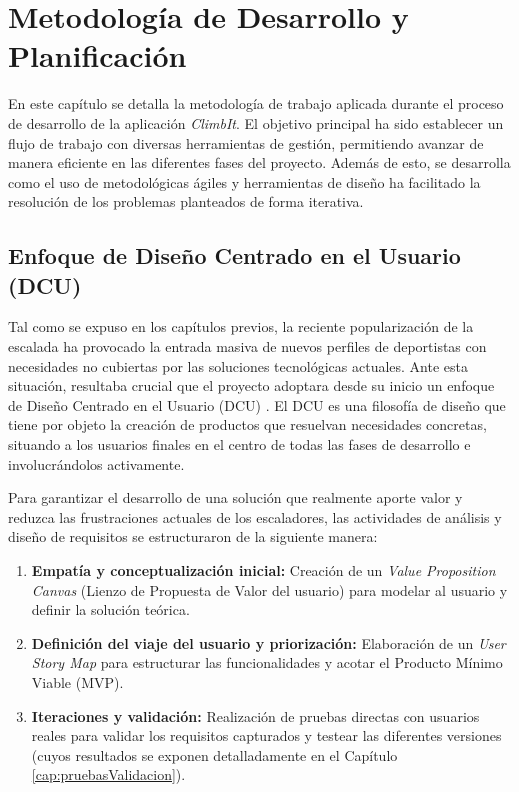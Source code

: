 \chapter{Metodología de Desarrollo y Planificación}
\label{cap:metodologiaDesarrollo}

En este capítulo se detalla la metodología de trabajo aplicada durante el proceso de desarrollo de la aplicación \textit{ClimbIt}. El objetivo principal ha sido establecer un flujo de trabajo con diversas herramientas de gestión, permitiendo avanzar de manera eficiente en las diferentes fases del proyecto. Además de esto, se desarrolla como el uso de metodológicas ágiles y herramientas de diseño ha facilitado la resolución de los problemas planteados de forma iterativa.

\section{Enfoque de Diseño Centrado en el Usuario (DCU)}

Tal como se expuso en los capítulos previos, la reciente popularización de la escalada ha provocado la entrada masiva de nuevos perfiles de deportistas con necesidades no cubiertas por las soluciones tecnológicas actuales. Ante esta situación, resultaba crucial que el proyecto adoptara desde su inicio un enfoque de Diseño Centrado en el Usuario (DCU) \cite{norman1986user}. El DCU es una filosofía de diseño que tiene por objeto la creación de productos que resuelvan necesidades concretas, situando a los usuarios finales en el centro de todas las fases de desarrollo e involucrándolos activamente.

Para garantizar el desarrollo de una solución que realmente aporte valor y reduzca las frustraciones actuales de los escaladores, las actividades de análisis y diseño  de requisitos se estructuraron de la siguiente manera:

\begin{enumerate}
\item \textbf{Empatía y conceptualización inicial:} Creación de un \textit{Value Proposition Canvas} (Lienzo de Propuesta de Valor del usuario) para modelar al usuario y definir la solución teórica.
\item \textbf{Definición del viaje del usuario y priorización:} Elaboración de un \textit{User Story Map} para estructurar las funcionalidades y acotar el Producto Mínimo Viable (MVP).
\item \textbf{Iteraciones y validación:} Realización de pruebas directas con usuarios reales para validar los requisitos capturados y testear las diferentes versiones 
(cuyos resultados se exponen detalladamente en el Capítulo \ref{cap:pruebasValidacion}).
\end{enumerate}

